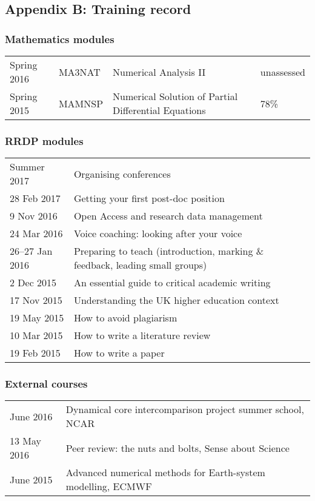 \documentclass[a4paper,11pt]{article}
\begin{document}
\newpage

\subsection*{Appendix B: Training record}

\subsubsection*{Mathematics modules}
\footnotesize
\begin{tabular}{l l l l}
Spring 2016	& MA3NAT & Numerical Analysis II & unassessed \\
Spring 2015	& MAMNSP & Numerical Solution of Partial Differential Equations  & 78\% \\
\end{tabular}

\subsubsection*{RRDP modules}
\begin{tabular}{l l}
Summer 2017	& Organising conferences \\
28 Feb 2017	& Getting your first post-doc position \\
9 Nov 2016      & Open Access and research data management \\
24 Mar 2016	& Voice coaching: looking after your voice \\
26--27 Jan 2016 & Preparing to teach (introduction, marking \& feedback, leading small groups) \\
2 Dec 2015	& An essential guide to critical academic writing \\
17 Nov 2015	& Understanding the UK higher education context \\
19 May 2015	& How to avoid plagiarism \\
10 Mar 2015	& How to write a literature review \\
19 Feb 2015	& How to write a paper \\
\end{tabular}

\subsubsection*{External courses}
\begin{tabular}{l l}
June 2016 & Dynamical core intercomparison project summer school, NCAR \\
13 May 2016 & Peer review: the nuts and bolts, Sense about Science \\
June 2015 & Advanced numerical methods for Earth-system modelling, ECMWF \\
\end{tabular}
\end{document}
